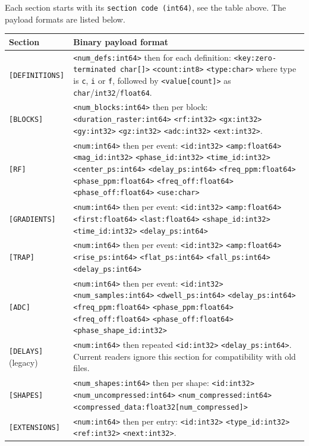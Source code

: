 \documentclass{article}
\begin{document}
Each section starts with its \verb.section code (int64)., see the table above. The payload formats are listed below.

\begin{center}
\begin{tabularx}{\textwidth}{lX}
\toprule
Section & Binary payload format \\
\midrule
\verb.[DEFINITIONS]. & \verb.<num_defs:int64>. then for each definition: \verb.<key:zero-terminated char[]>. \verb.<count:int8>. \verb.<type:char>. where type is \verb.c., \verb.i. or \verb.f., followed by \verb.<value[count]>. as \verb.char./\verb.int32./\verb.float64.. \\
\verb.[BLOCKS]. & \verb.<num_blocks:int64>. then per block: \verb.<duration_raster:int64>. \verb.<rf:int32>. \verb.<gx:int32>. \verb.<gy:int32>. \verb.<gz:int32>. \verb.<adc:int32>. \verb.<ext:int32>.. \\
\verb.[RF]. & \verb.<num:int64>. then per event: \verb.<id:int32>. \verb.<amp:float64>. \verb.<mag_id:int32>. \verb.<phase_id:int32>. \verb.<time_id:int32>. \verb.<center_ps:int64>. \verb.<delay_ps:int64>. \verb.<freq_ppm:float64>. \verb.<phase_ppm:float64>. \verb.<freq_off:float64>. \verb.<phase_off:float64>. \verb.<use:char>. \\
\verb.[GRADIENTS]. & \verb.<num:int64>. then per event: \verb.<id:int32>. \verb.<amp:float64>. \verb.<first:float64>. \verb.<last:float64>. \verb.<shape_id:int32>. \verb.<time_id:int32>. \verb.<delay_ps:int64>. \\
\verb.[TRAP]. & \verb.<num:int64>. then per event: \verb.<id:int32>. \verb.<amp:float64>. \verb.<rise_ps:int64>. \verb.<flat_ps:int64>. \verb.<fall_ps:int64>. \verb.<delay_ps:int64>. \\
\verb.[ADC]. & \verb.<num:int64>. then per event: \verb.<id:int32>. \verb.<num_samples:int64>. \verb.<dwell_ps:int64>. \verb.<delay_ps:int64>. \verb.<freq_ppm:float64>. \verb.<phase_ppm:float64>. \verb.<freq_off:float64>. \verb.<phase_off:float64>. \verb.<phase_shape_id:int32>. \\
\verb.[DELAYS]. (legacy) & \verb.<num:int64>. then repeated \verb.<id:int32>. \verb.<delay_ps:int64>.. Current readers ignore this section for compatibility with old files. \\
\verb.[SHAPES]. & \verb.<num_shapes:int64>. then per shape: \verb.<id:int32>. \verb.<num_uncompressed:int64>. \verb.<num_compressed:int64>. \verb.<compressed_data:float32[num_compressed]>. \\
\verb.[EXTENSIONS]. & \verb.<num:int64>. then per entry: \verb.<id:int32>. \verb.<type_id:int32>. \verb.<ref:int32>. \verb.<next:int32>.. \\
\bottomrule
\end{tabularx}
\end{center}
\end{document}
